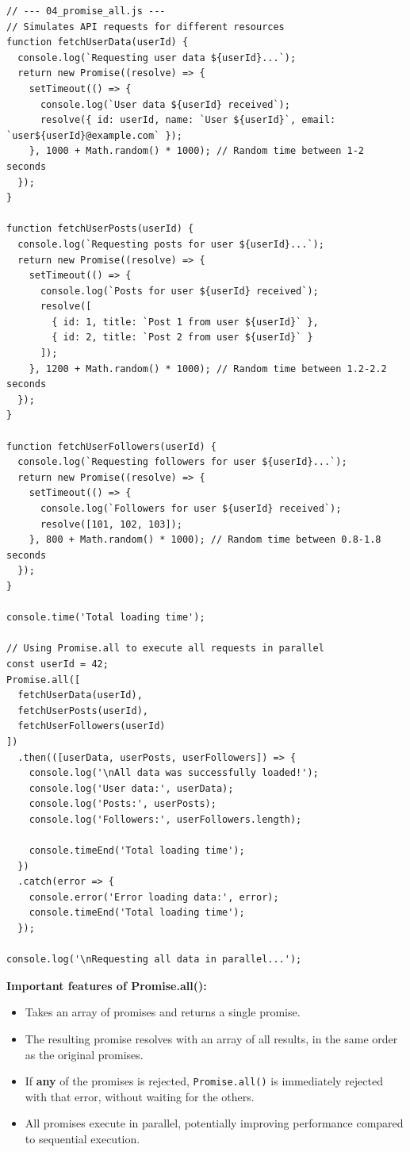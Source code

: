 \documentclass[12pt,letterpaper]{article}
\newenvironment{macterminal}{%
    \begin{mdframed}[
        linecolor=terminalFrame,
        backgroundcolor=terminalBg,
        roundcorner=5pt,
        skipabove=5pt,
        skipbelow=5pt,
        linewidth=1pt,
        innertopmargin=5pt,
        frametitle={%
            \tikz[baseline=(current bounding box.east), outer sep=0pt]{
                \fill[red!80!black] (0,0) circle (5pt);
                \fill[yellow!80!black] (0.7,0) circle (5pt);
                \fill[green!70!black] (1.4,0) circle (5pt);
            }
        },
        frametitlealignment=\raggedright,
        frametitleaboveskip=8pt,
        frametitlebelowskip=0pt,
    ]
}{%
    \end{mdframed}%
}
\begin{document}
\begin{macterminal}
\begin{lstlisting}
// --- 04_promise_all.js ---
// Simulates API requests for different resources
function fetchUserData(userId) {
  console.log(`Requesting user data ${userId}...`);
  return new Promise((resolve) => {
    setTimeout(() => {
      console.log(`User data ${userId} received`);
      resolve({ id: userId, name: `User ${userId}`, email: `user${userId}@example.com` });
    }, 1000 + Math.random() * 1000); // Random time between 1-2 seconds
  });
}

function fetchUserPosts(userId) {
  console.log(`Requesting posts for user ${userId}...`);
  return new Promise((resolve) => {
    setTimeout(() => {
      console.log(`Posts for user ${userId} received`);
      resolve([
        { id: 1, title: `Post 1 from user ${userId}` },
        { id: 2, title: `Post 2 from user ${userId}` }
      ]);
    }, 1200 + Math.random() * 1000); // Random time between 1.2-2.2 seconds
  });
}

function fetchUserFollowers(userId) {
  console.log(`Requesting followers for user ${userId}...`);
  return new Promise((resolve) => {
    setTimeout(() => {
      console.log(`Followers for user ${userId} received`);
      resolve([101, 102, 103]);
    }, 800 + Math.random() * 1000); // Random time between 0.8-1.8 seconds
  });
}

console.time('Total loading time');

// Using Promise.all to execute all requests in parallel
const userId = 42;
Promise.all([
  fetchUserData(userId),
  fetchUserPosts(userId),
  fetchUserFollowers(userId)
])
  .then(([userData, userPosts, userFollowers]) => {
    console.log('\nAll data was successfully loaded!');
    console.log('User data:', userData);
    console.log('Posts:', userPosts);
    console.log('Followers:', userFollowers.length);
    
    console.timeEnd('Total loading time');
  })
  .catch(error => {
    console.error('Error loading data:', error);
    console.timeEnd('Total loading time');
  });

console.log('\nRequesting all data in parallel...');
\end{lstlisting}
\end{macterminal}

\textbf{Important features of Promise.all():}
\begin{itemize}
    \item Takes an array of promises and returns a single promise.
    \item The resulting promise resolves with an array of all results, in the same order as the original promises.
    \item If \textbf{any} of the promises is rejected, \texttt{\textcolor{accentColor}{Promise.all()}} is immediately rejected with that error, without waiting for the others.
    \item All promises execute in parallel, potentially improving performance compared to sequential execution.
\end{itemize}
\end{document}
